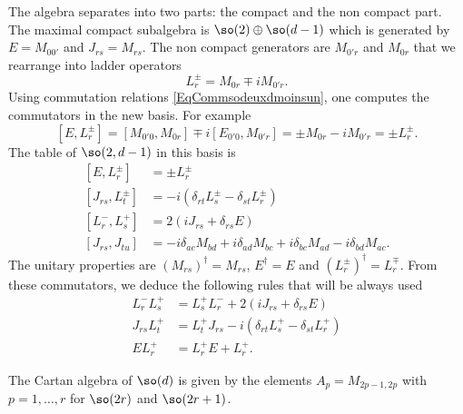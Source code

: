 The algebra separates into two parts: the compact and the non compact part. The maximal compact subalgebra is $\so(2)\oplus\so(d-1)$ which is generated by $E=M_{00'}$ and $J_{rs}=M_{rs}$. The non compact generators are $M_{0'r}$ and $M_{0r}$ that we rearrange into ladder operators
\begin{equation}
	L^{\pm}_r=M_{0r}\mp iM_{0'r}.
\end{equation}
Using commutation relations \eqref{EqCommsodeuxdmoinsun}, one computes the commutators in the new basis. For example
\[
	[E,L^{\pm}_r]=[M_{0'0},M_{0r}]\mp i[E_{0'0},M_{0'r}]=\pm M_{0r}-iM_{0'r}=\pm L^{\pm}_r.
\]
The table of $\so(2,d-1)$ in this basis is
\begin{subequations}		\label{SubEqsCommssodeuxd}
	\begin{align}
		[E,L^{\pm}_r]&=\pm L^{\pm}_r\\
		[J_{rs},L_t^{\pm}]&=-i(\delta_{rt}L_s^{\pm}-\delta_{st}L_r^{\pm})\\
		[L_r^{-},L_s^+]&=2(iJ_{rs}+\delta_{rs}E)\\
		[J_{rs},J_{tu}]&=-i\delta_{ac}M_{bd}+i\delta_{ad}M_{bc}+i\delta_{bc}M_{ad}-i\delta_{bd}M_{ac}.
	\end{align}
\end{subequations}
The unitary properties are $(M_{rs})^{\dag}=M_{rs}$, $E^{\dag}=E$ and $(L^{\pm}_r)^{\dag}=L_r^{\mp}$. From these commutators, we deduce the following rules that will be always used
\begin{subequations}
	\begin{align}
		L^-_rL^+_s&=L^+_sL^-_r+2(iJ_{rs}+\delta_{rs}E)\\
		J_{rs}L^+_t&=L^+_tJ_{rs}-i(\delta_{rt}L^+_s-\delta_{st}L^+_r)\\
		EL^+_r&=L^+_rE+L^+_r.
	\end{align}
\end{subequations}

The Cartan algebra of $\so(d)$ is given by the elements $A_p=M_{2p-1,2p}$ with $p=1,\ldots, r$ for $\so(2r)$ and $\so(2r+1)$.

